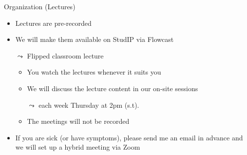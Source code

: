 \documentclass[aspectratio=169]{../latex_main/tntbeamer}  %
\begin{document}
\begin{frame}[c]{Organization (Lectures)}
	
	\begin{itemize}
		\item Lectures are pre-recorded
		\item We will make them available on StudIP via Flowcast
		\item[$\leadsto$] Flipped classroom lecture
		\begin{itemize}
		    \item You watch the lectures whenever it suits you
		    \item We will discuss the lecture content in our on-site sessions
		    \item[$\leadsto$] each week Thursday at 2pm (s.t).
		    \item The meetings will not be recorded
		\end{itemize}
            \item If you are sick (or have symptoms), please send me an email in advance and we will set up a hybrid meeting via Zoom
	\end{itemize}
	
\end{frame}
\end{document}
